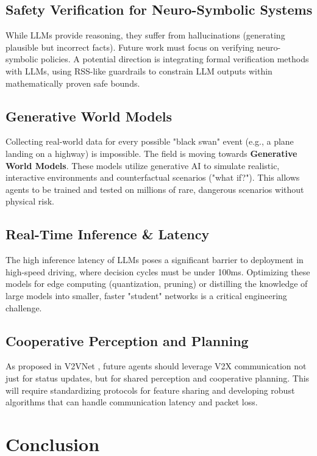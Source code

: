 \documentclass[12pt, a4paper]{article}
\begin{document}
\subsection{Safety Verification for Neuro-Symbolic Systems}
While LLMs provide reasoning, they suffer from hallucinations (generating plausible but incorrect facts). Future work must focus on verifying neuro-symbolic policies. A potential direction is integrating formal verification methods with LLMs, using RSS-like guardrails \citep{shalev2016safe} to constrain LLM outputs within mathematically proven safe bounds.

\subsection{Generative World Models}
Collecting real-world data for every possible "black swan" event (e.g., a plane landing on a highway) is impossible. The field is moving towards \textbf{Generative World Models}. These models utilize generative AI to simulate realistic, interactive environments and counterfactual scenarios ("what if?"). This allows agents to be trained and tested on millions of rare, dangerous scenarios without physical risk.

\subsection{Real-Time Inference \texorpdfstring{\&}{and} Latency}
The high inference latency of LLMs poses a significant barrier to deployment in high-speed driving, where decision cycles must be under 100ms. Optimizing these models for edge computing (quantization, pruning) or distilling the knowledge of large models into smaller, faster "student" networks is a critical engineering challenge.

\subsection{Cooperative Perception and Planning}
As proposed in V2VNet \citep{wang2020v2vnet}, future agents should leverage V2X communication not just for status updates, but for shared perception and cooperative planning. This will require standardizing protocols for feature sharing and developing robust algorithms that can handle communication latency and packet loss.

\section{Conclusion}
\label{sec:conclusion}
\end{document}
